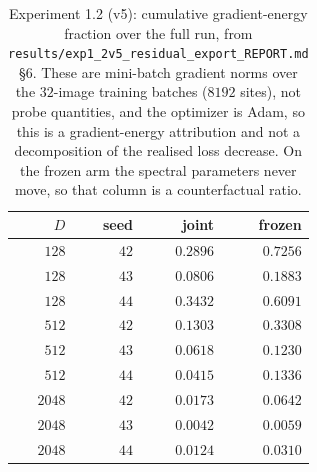 \begin{table}[htbp]
\centering
\caption{Experiment 1.2 (v5): cumulative gradient-energy fraction over the
full run, from \texttt{results/exp1\_2v5\_residual\_export\_REPORT.md} \S6.
These are mini-batch gradient norms over the $32$-image training batches
($8192$ sites), not probe quantities, and the optimizer is Adam, so this is a
gradient-energy attribution and not a decomposition of the realised loss
decrease. On the frozen arm the spectral parameters never move, so that column
is a counterfactual ratio.}
\label{tab:app_v5_cum}
\begin{tabular}{rrrr}
\toprule
$D$ & seed & joint & frozen \\
\midrule
$128$  & $42$ & $0.2896$ & $0.7256$ \\
$128$  & $43$ & $0.0806$ & $0.1883$ \\
$128$  & $44$ & $0.3432$ & $0.6091$ \\
$512$  & $42$ & $0.1303$ & $0.3308$ \\
$512$  & $43$ & $0.0618$ & $0.1230$ \\
$512$  & $44$ & $0.0415$ & $0.1336$ \\
$2048$ & $42$ & $0.0173$ & $0.0642$ \\
$2048$ & $43$ & $0.0042$ & $0.0059$ \\
$2048$ & $44$ & $0.0124$ & $0.0310$ \\
\bottomrule
\end{tabular}
\end{table}

